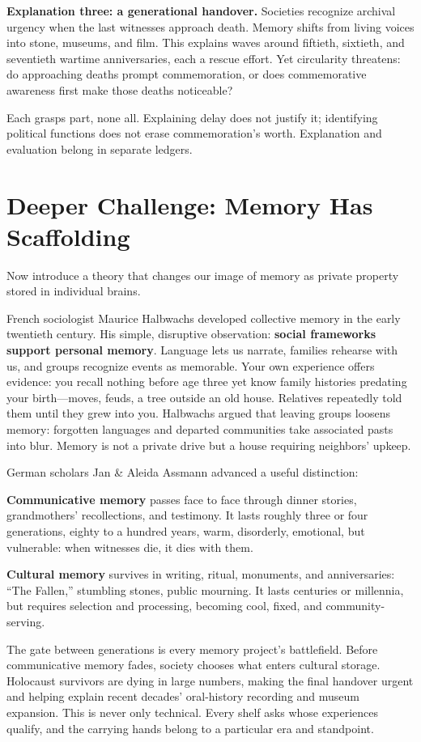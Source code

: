 \textbf{Explanation three: a generational handover.} Societies recognize archival urgency when the last witnesses approach death. Memory shifts from living voices into stone, museums, and film. This explains waves around fiftieth, sixtieth, and seventieth wartime anniversaries, each a rescue effort. Yet circularity threatens: do approaching deaths prompt commemoration, or does commemorative awareness first make those deaths noticeable?

Each grasps part, none all. Explaining delay does not justify it; identifying political functions does not erase commemoration's worth. Explanation and evaluation belong in separate ledgers.

\section{Deeper Challenge: Memory Has Scaffolding}
Now introduce a theory that changes our image of memory as private property stored in individual brains.

French sociologist Maurice Halbwachs developed collective memory in the early twentieth century. His simple, disruptive observation: \textbf{social frameworks support personal memory}. Language lets us narrate, families rehearse with us, and groups recognize events as memorable. Your own experience offers evidence: you recall nothing before age three yet know family histories predating your birth---moves, feuds, a tree outside an old house. Relatives repeatedly told them until they grew into you. Halbwachs argued that leaving groups loosens memory: forgotten languages and departed communities take associated pasts into blur. Memory is not a private drive but a house requiring neighbors' upkeep.

German scholars Jan \& Aleida Assmann advanced a useful distinction:

\textbf{Communicative memory} passes face to face through dinner stories, grandmothers' recollections, and testimony. It lasts roughly three or four generations, eighty to a hundred years, warm, disorderly, emotional, but vulnerable: when witnesses die, it dies with them.

\textbf{Cultural memory} survives in writing, ritual, monuments, and anniversaries: ``The Fallen,'' stumbling stones, public mourning. It lasts centuries or millennia, but requires selection and processing, becoming cool, fixed, and community-serving.

The gate between generations is every memory project's battlefield. Before communicative memory fades, society chooses what enters cultural storage. Holocaust survivors are dying in large numbers, making the final handover urgent and helping explain recent decades' oral-history recording and museum expansion. This is never only technical. Every shelf asks whose experiences qualify, and the carrying hands belong to a particular era and standpoint.

